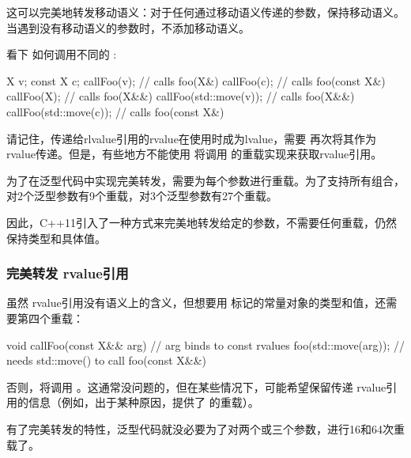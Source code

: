 这可以完美地转发移动语义：对于任何通过移动语义传递的参数，保持移动语义。当遇到没有移动语义的参数时，不添加移动语义。

看下  如何调用不同的 :

\begin{cppcode}
X v;
const X c;
callFoo(v); // calls foo(X&)
callFoo(c); // calls foo(const X&)
callFoo(X{}); // calls foo(X&&)
callFoo(std::move(v)); // calls foo(X&&)
callFoo(std::move(c)); // calls foo(const X&)
\end{cppcode}

请记住，传递给rlvalue引用的rvalue在使用时成为lvalue，需要  再次将其作为rvalue传递。但是，有些地方不能使用  将调用  的重载实现来获取rvalue引用。

为了在泛型代码中实现完美转发，需要为每个参数进行重载。为了支持所有组合，对2个泛型参数有9个重载，对3个泛型参数有27个重载。

因此，C++11引入了一种方式来完美地转发给定的参数，不需要任何重载，仍然保持类型和具体值。

\subsubsection{完美转发  rvalue引用}

虽然  rvalue引用没有语义上的含义，但想要用  标记的常量对象的类型和值，还需要第四个重载：

\begin{cppcode}
void callFoo(const X&& arg) { // arg binds to const rvalues
	foo(std::move(arg)); // needs std::move() to call foo(const X&&)
}
\end{cppcode}

否则，将调用 。这通常没问题的，但在某些情况下，可能希望保留传递  rvalue引用的信息（例如，出于某种原因，提供了  的重载）。

有了完美转发的特性，泛型代码就没必要为了对两个或三个参数，进行16和64次重载了。


















